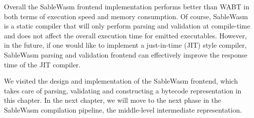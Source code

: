 Overall the SableWasm frontend implementation performs better than WABT in both
terms of execution speed and memory consumption. Of course, SableWasm is a
static compiler that will only perform parsing and validation at compile-time
and does not affect the overall execution time for emitted executables. However,
in the future, if one would like to implement a just-in-time (JIT) style
compiler, SableWasm parsing and validation frontend can effectively improve the
response time of the JIT compiler.

We visited the design and implementation of the SableWasm frontend, which takes
care of parsing, validating and constructing a bytecode representation in this
chapter. In the next chapter, we will move to the next phase in the SableWasm
compilation pipeline, the middle-level intermediate representation.